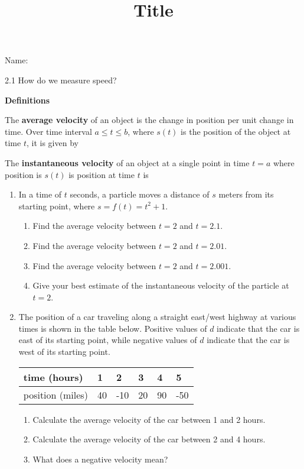 \documentclass[12pt]{article}
\title{Title}
\begin{document}

 Name:
 \begin{center}\large{2.1 How do we measure speed?}\end{center}




\begin{tcolorbox}
\textbf{Definitions}

The \textbf{average velocity} of an object is the change in position per unit change in time. Over time interval $a\leq t \leq b$, where $s(t)$ is the position of the object at time $t$, it is given by 
	\vspace{10mm}

The \textbf{instantaneous velocity} of an object at a single point in time $t=a$ where position is $s(t)$ is position at time $t$ is 

	
	\vspace{10mm}
\end{tcolorbox}
	
\begin{enumerate}
\item In a time of $t$ seconds, a particle moves a distance of $s$ meters from its starting point, where $s=f(t)=t^2+1$. 
	\begin{enumerate}
	\item Find the average velocity between $t=2$ and $t=2.1$.
	\vfill
	\item Find the average velocity between $t=2$ and $t=2.01$.
	\vfill
	\item Find the average velocity between $t=2$ and $t=2.001$.
	\vfill
	\item Give your best estimate of the instantaneous velocity of the particle at $t=2$.
	\end{enumerate}

\item The position of a car traveling along a straight east/west highway at various times is shown in the table below. Positive values of $d$ indicate that the car is east of its starting point, while negative values of $d$ indicate that the car is west of its starting point.\\

\begin{tabular}{l|lllll} 
time (hours) & 1&2&3&4&5\\
\hline
position (miles) & 40 & -10 & 20 & 90 & -50\\
\end{tabular}

	\begin{enumerate}
	\item Calculate the average velocity of the car between 1 and 2 hours.
	\vfill
	\item Calculate the average velocity of the car between 2 and 4 hours.
	\vfill
	\item What does a negative velocity mean?
	\vfill
	\end{enumerate}


\end{enumerate}
\end{document}
